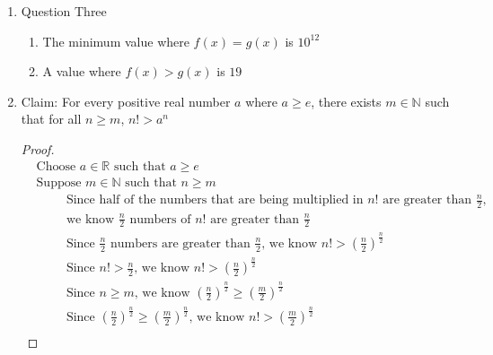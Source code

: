 \documentclass{article}
\begin{document}
\begin{enumerate}
\begin{enumerate}
\begin{proof}
\begin{eqnarray}
                &&\text{Since } n \text{ has one digit } n < 10 \\
                &&\text{Since } n<10 \text{ and the number of digits of } n=1, \text{ the sum of the digits is } n
            \end{eqnarray}
            (Inductive Step):
        \end{proof}
    \end{enumerate}
    \item Question Three
    \begin{enumerate}
        \item The minimum value where $f(x) = g(x)$ is $10^{12}$
        \item A value where $f(x) > g(x)$ is $19$
    \end{enumerate}
    \item Claim: For every positive real number $a$ where $a \geq e$, there exists $m \in \mathbb{N}$ such that for all $n \geq m$, $n! > a^n$
    \begin{proof}
        \begin{align}
            &\text{Choose } a \in \mathbb{R} \text{ such that }  a \geq e \\
            &\text{Suppose } m \in \mathbb{N} \text{ such that } n \geq m \\
            &\hspace{1cm} \text{Since half of the numbers that are being multiplied in } n! \text{ are greater than } \frac{n}{2} \text{,} \\
            &\hspace{1cm} \text{we know } \frac{n}{2} \text{ numbers of } n! \text{ are greater than } \frac{n}{2} \nonumber \\
            &\hspace{1cm} \text{Since } \frac{n}{2} \text{ numbers are greater than } \frac{n}{2} \text{, we know } n! > \left (\frac{n}{2}\right )^{\frac{n}{2}} \\
            &\hspace{1cm} \text{Since } n! > \frac{n}{2} \text{, we know } n! > \left (\frac{n}{2} \right )^{\frac{n}{2}} \\
            &\hspace{1cm} \text{Since } n \geq m \text{, we know } \left (\frac{n}{2}\right )^{\frac{n}{2}} \geq \left (\frac{m}{2}\right )^{\frac{n}{2}} \\
            &\hspace{1cm} \text{Since } \left (\frac{n}{2}\right )^{\frac{n}{2}} \geq \left (\frac{m}{2}\right )^{\frac{n}{2}} \text{, we know } n! > \left (\frac{m}{2}\right )^{\frac{n}{2}} \\

\end{align}
\end{proof}
\end{enumerate}
\end{document}
